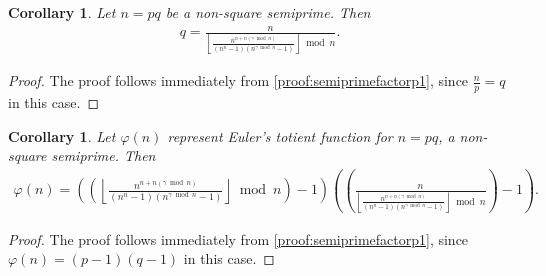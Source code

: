 \documentclass{article}
\theoremstyle{plain}
\newtheorem{corollary}[theorem]{Corollary}
\theoremstyle{definition}
\newcommand{\floor}[1]{\left\lfloor #1 \right\rfloor}
\begin{document}
\begin{corollary} \label{proof:semiprimefactorp2}
Let $n=pq$ be a non-square semiprime. Then
\begin{align*}
q = \frac{n}{\floor{\frac{n^{n+n(\gamma \bmod n)}}{(n^n-1)(n^{\gamma \bmod n}-1)}}\bmod n}.
\end{align*}

\end{corollary}
\begin{proof}
The proof follows immediately from \cref{proof:semiprimefactorp1}, since $\frac{n}{p} = q$ in this case.
\end{proof}
\begin{corollary} \label{proof:semiprimetotient}
Let $\varphi(n)$ represent Euler's totient function for $n=pq$, a non-square semiprime. Then
\begin{align*}
\varphi(n) = \left(\left( \floor{\frac{n^{n+n(\gamma \bmod n)}}{(n^n-1)(n^{\gamma \bmod n}-1)}}\bmod n \right) - 1 \right) \left( \left( \frac{n}{\floor{\frac{n^{n+n(\gamma \bmod n)}}{(n^n-1)(n^{\gamma \bmod n}-1)}}\bmod n} \right) - 1 \right).
\end{align*}
\end{corollary}
\begin{proof}
The proof follows immediately from \cref{proof:semiprimefactorp1}, since $\varphi(n) = (p - 1)(q - 1)$ in this case.
\end{proof}

\footnotesize
\begingroup
\raggedright


\endgroup
\normalsize
\end{document}
